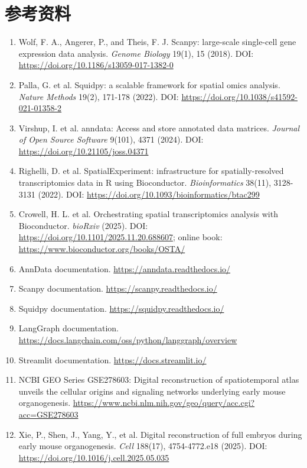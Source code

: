 \documentclass[11pt,a4paper]{article}
\begin{document}
\section*{参考资料}

\begin{enumerate}
  \item Wolf, F. A., Angerer, P., and Theis, F. J. Scanpy: large-scale single-cell gene expression data analysis.
  \textit{Genome Biology} 19(1), 15 (2018). DOI: \url{https://doi.org/10.1186/s13059-017-1382-0}
  \item Palla, G. et al. Squidpy: a scalable framework for spatial omics analysis. \textit{Nature Methods} 19(2), 171-178 (2022).
  DOI: \url{https://doi.org/10.1038/s41592-021-01358-2}
  \item Virshup, I. et al. anndata: Access and store annotated data matrices. \textit{Journal of Open Source Software}
  9(101), 4371 (2024). DOI: \url{https://doi.org/10.21105/joss.04371}
  \item Righelli, D. et al. SpatialExperiment: infrastructure for spatially-resolved transcriptomics data in R using Bioconductor.
  \textit{Bioinformatics} 38(11), 3128-3131 (2022). DOI: \url{https://doi.org/10.1093/bioinformatics/btac299}
  \item Crowell, H. L. et al. Orchestrating spatial transcriptomics analysis with Bioconductor. \textit{bioRxiv} (2025).
  DOI: \url{https://doi.org/10.1101/2025.11.20.688607}; online book: \url{https://www.bioconductor.org/books/OSTA/}
  \item AnnData documentation. \url{https://anndata.readthedocs.io/}
  \item Scanpy documentation. \url{https://scanpy.readthedocs.io/}
  \item Squidpy documentation. \url{https://squidpy.readthedocs.io/}
  \item LangGraph documentation. \url{https://docs.langchain.com/oss/python/langgraph/overview}
  \item Streamlit documentation. \url{https://docs.streamlit.io/}
  \item NCBI GEO Series GSE278603: Digital reconstruction of spatiotemporal atlas unveils the cellular origins and signaling networks underlying early mouse organogenesis.
  \url{https://www.ncbi.nlm.nih.gov/geo/query/acc.cgi?acc=GSE278603}
  \item Xie, P., Shen, J., Yang, Y., et al. Digital reconstruction of full embryos during early mouse organogenesis.
  \textit{Cell} 188(17), 4754-4772.e18 (2025).
  DOI: \url{https://doi.org/10.1016/j.cell.2025.05.035}
\end{enumerate}
\end{document}
